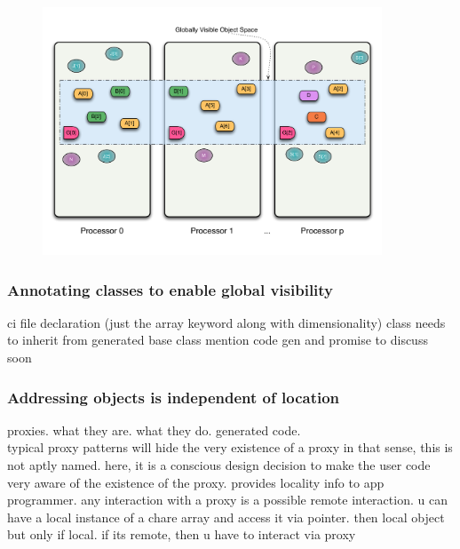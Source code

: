 \begin{frame}
  \frametitle{
  }
  \begin{figure}\includegraphics[width=0.9\textwidth]{../figures/progmodel/07-obj-programmer-view.pdf}\end{figure}
\end{frame}


\begin{frame}
  \frametitle{Annotating classes to enable global visibility}
  ci file declaration (just the array keyword along with dimensionality)
  class needs to inherit from generated base class
  mention code gen and promise to discuss soon
\end{frame}


\begin{frame}
  \frametitle{Addressing objects is independent of location}
  proxies. what they are. what they do. generated code.\\
  typical proxy patterns will hide the very existence of a proxy
  in that sense, this is not aptly named.
  here, it is a conscious design decision to make the user code very aware of
  the existence of the proxy. provides locality info to app programmer.
  any interaction with a proxy is a possible remote interaction.
  u can have a local instance of a chare array and access it via pointer. then local object
  but only if local. if its remote, then u have to interact via proxy
\end{frame}


